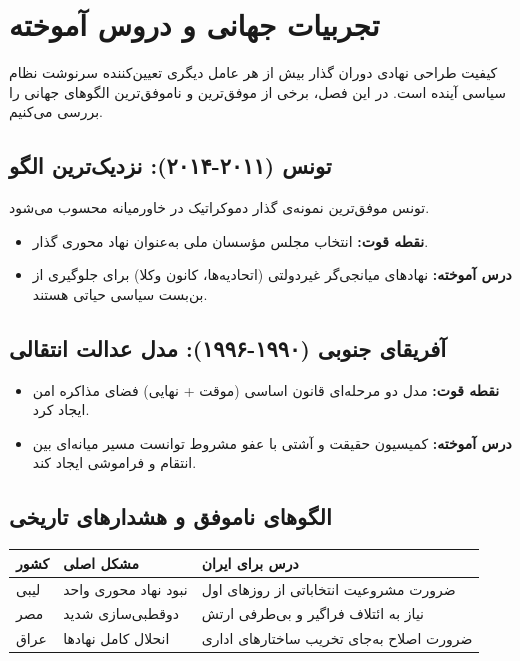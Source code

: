 \chapter{تجربیات جهانی و دروس آموخته}

کیفیت طراحی نهادی دوران گذار بیش از هر عامل دیگری تعیین‌کننده سرنوشت نظام سیاسی آینده است. در این فصل، برخی از موفق‌ترین و ناموفق‌ترین الگوهای جهانی را بررسی می‌کنیم.

\section{تونس (۲۰۱۱-۲۰۱۴): نزدیک‌ترین الگو}
تونس موفق‌ترین نمونه‌ی گذار دموکراتیک در خاورمیانه محسوب می‌شود.
\begin{itemize}
    \item \textbf{نقطه قوت:} انتخاب مجلس مؤسسان ملی به‌عنوان نهاد محوری گذار.
    \item \textbf{درس آموخته:} نهادهای میانجی‌گر غیردولتی (اتحادیه‌ها، کانون وکلا) برای جلوگیری از بن‌بست سیاسی حیاتی هستند.
\end{itemize}

\section{آفریقای جنوبی (۱۹۹۰-۱۹۹۶): مدل عدالت انتقالی}
\begin{itemize}
    \item \textbf{نقطه قوت:} مدل دو مرحله‌ای قانون اساسی (موقت + نهایی) فضای مذاکره امن ایجاد کرد.
    \item \textbf{درس آموخته:} کمیسیون حقیقت و آشتی با عفو مشروط توانست مسیر میانه‌ای بین انتقام و فراموشی ایجاد کند.
\end{itemize}

\section{الگوهای ناموفق و هشدارهای تاریخی}
\begin{tabular}{lp{4cm}p{6cm}}
\toprule
\textbf{کشور} & \textbf{مشکل اصلی} & \textbf{درس برای ایران} \\
\midrule
لیبی & نبود نهاد محوری واحد & ضرورت مشروعیت انتخاباتی از روزهای اول \\
مصر & دوقطبی‌سازی شدید & نیاز به ائتلاف فراگیر و بی‌طرفی ارتش \\
عراق & انحلال کامل نهادها & ضرورت اصلاح به‌جای تخریب ساختارهای اداری \\
\bottomrule
\end{tabular}

